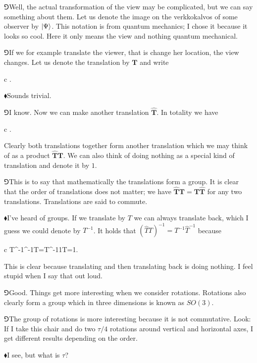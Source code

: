 \documentclass[10pt,oneside%
]{memoir}
\newenvironment{eqna}{\begin{IEEEeqnarray*}{c}}{\end{IEEEeqnarray*}\ignorespacesafterend}
\renewcommand{\vec}[1]{\mathbf{#1}}
\newcommand{\primed}[1]{\hat{#1}}
\newcommand{\circc}{\tau}
\newcommand{\hea}{\(\blacklozenge\)\;}
\newcommand{\heb}{\(\Game\)\;}
\begin{document}
\heb Well, the actual transformation of the view may be complicated, but we can say something about them. Let us denote the image on the verkkokalvos of some observer by \(\ket{\Psi}\). This notation is from quantum mechanics; I chose it because it looks so cool. Here it only means the view and nothing quantum mechanical.

\heb If we for example translate the viewer, that is change her location, the view changes. Let us denote the translation by \(\vec{T}\) and write
\begin{eqna}
    \ket{\Psi}\rightarrow\vec{T}\ket{\Psi}.
\end{eqna}

\hea Sounds trivial.

\heb I know. Now we can make another translation \(\primed{\vec{T}}\). In totality we have
\begin{eqna}
    \ket{\Psi}\rightarrow\vec{T}\ket{\Psi}\rightarrow\primed{\vec{T}}\vec{T}\ket{\Psi}.
\end{eqna}
Clearly both translations together form another translation which we may think of as a product \(\primed{\vec{T}}\vec{T}\). We can also think of doing nothing as a special kind of translation and denote it by \(1\).

\heb This is to say that mathematically the translations form a group. It is clear that the order of translations does not matter; we have \(\primed{\vec{T}}\vec{T}=\vec{T}\primed{\vec{T}}\) for any two translations. Translations are said to commute.

\hea I've heard of groups. If we translate by \(T\) we can always translate back, which I guess we could denote by \(T^{-1}\). It holds that \((\primed{T}T)^{-1}=T^{-1}\primed{T}^{-1}\) because
\begin{eqna}
    T^{-1}\primed{T}^{-1}\primed{T}T=T^{-1}1T=1.
\end{eqna}
This is clear because translating and then translating back is doing nothing. I feel stupid when I say that out loud.

\heb Good. Things get more interesting when we consider rotations. Rotations also clearly form a group which in three dimensions is known as \(SO(3)\).

\heb The group of rotations is more interesting because it is not commutative. Look: If I take this chair and do two \(\circc/4\) rotations around vertical and horizontal axes, I get different results depending on the order.

\hea I see, but what is \(\circc\)?
\end{document}
